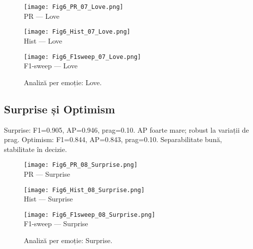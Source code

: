 \begin{figure}[H]
  \centering
  \begin{minipage}[t]{0.32\textwidth}\centering
    \texttt{[image: Fig6\_PR\_07\_Love.png]}\\[-1mm]
    {\scriptsize PR — Love}
  \end{minipage}\hfill
  \begin{minipage}[t]{0.32\textwidth}\centering
    \texttt{[image: Fig6\_Hist\_07\_Love.png]}\\[-1mm]
    {\scriptsize Hist — Love}
  \end{minipage}\hfill
  \begin{minipage}[t]{0.32\textwidth}\centering
    \texttt{[image: Fig6\_F1sweep\_07\_Love.png]}\\[-1mm]
    {\scriptsize F1-sweep — Love}
  \end{minipage}
  \caption{Analiză per emoție: Love.}
  \label{fig:c6-love}
\end{figure}

\subsection{Surprise și Optimism}
\noindent Surprise: F1=0.905, AP=0.946, prag=0.10. AP foarte mare; robust la variații de prag.
\noindent Optimism: F1=0.844, AP=0.843, prag=0.10. Separabilitate bună, stabilitate în decizie.

\begin{figure}[H]
  \centering
  \begin{minipage}[t]{0.32\textwidth}\centering
    \texttt{[image: Fig6\_PR\_08\_Surprise.png]}\\[-1mm]
    {\scriptsize PR — Surprise}
  \end{minipage}\hfill
  \begin{minipage}[t]{0.32\textwidth}\centering
    \texttt{[image: Fig6\_Hist\_08\_Surprise.png]}\\[-1mm]
    {\scriptsize Hist — Surprise}
  \end{minipage}\hfill
  \begin{minipage}[t]{0.32\textwidth}\centering
    \texttt{[image: Fig6\_F1sweep\_08\_Surprise.png]}\\[-1mm]
    {\scriptsize F1-sweep — Surprise}
  \end{minipage}
  \caption{Analiză per emoție: Surprise.}
  \label{fig:c6-surprise}
\end{figure}

